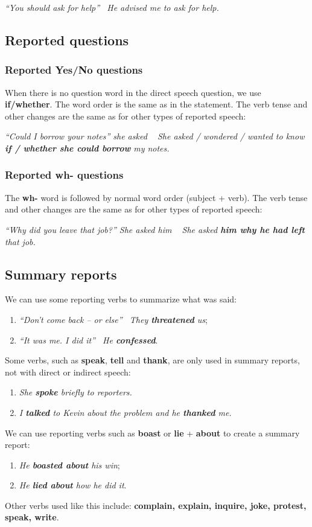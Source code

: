 \documentclass{article}
\newcommand{\tox}{\textrightarrow\ }
\begin{document}
\textit{``You should ask for help'' \tox He advised me to ask for help.}

\subsection{Reported questions}
\subsubsection{Reported Yes/No questions}
When there is no question word in the direct speech question, we use
\textbf{if/whether}. The word order is the same as in the statement.
The verb tense and other changes are the same as for other types of
reported speech:

\textit{``Could I borrow your notes'' she asked \tox
She asked / wondered / wanted to know \textbf{if / whether she could
borrow} my notes.}

\subsubsection{Reported wh- questions}
The \textbf{wh-} word is followed by normal word order (subject + verb).
The verb tense and other changes are the same as for other types of
reported speech:

\textit{``Why did you leave that job?'' She asked him \tox
She asked \textbf{him why he had left} that job.}

\subsection{Summary reports}
We can use some reporting verbs to summarize what was said:

\begin{enumerate}
    \item \textit{``Don't come back -- or else'' \tox They \textbf{threatened} us};
    \item \textit{``It was me. I did it'' \tox He \textbf{confessed}}.
\end{enumerate}

Some verbs, such as \textbf{speak}, \textbf{tell} and \textbf{thank}, are only used in summary
reports, not with direct or indirect speech:

\begin{enumerate}
    \item \textit{She \textbf{spoke} briefly to reporters.}
    \item \textit{I \textbf{talked} to Kevin about the problem and he \textbf{thanked} me.}
\end{enumerate}

We can use reporting verbs such as \textbf{boast} or \textbf{lie} + \textbf{about}
to create a summary report:

\begin{enumerate}
    \item \textit{He \textbf{boasted about} his win};
    \item \textit{He \textbf{lied about} how he did it}.
\end{enumerate}

Other verbs used like this include: \textbf{complain, explain, inquire,
joke, protest, speak, write}.
\end{document}
